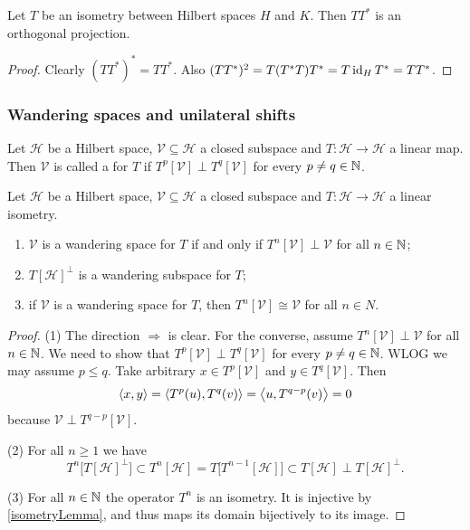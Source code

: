 \begin{lemma} \label{isometryRangeProjection}
Let $T$ be an isometry between Hilbert spaces $H$ and $K$. Then $TT^*$ is an orthogonal projection.
\end{lemma}
\begin{proof}
Clearly $(TT^*)^* = TT^*$. Also $(TT^*)^2 = T(T^*T)T^* = T\operatorname{id}_HT^* = TT^*$.
\end{proof}


\subsubsection{Wandering spaces and unilateral shifts}
\begin{definition}
Let $\mathcal{H}$ be a Hilbert space, $\mathcal{V}\subseteq \mathcal{H}$ a closed subspace and $T:\mathcal{H}\to \mathcal{H}$ a linear map. Then $\mathcal{V}$ is called a  for $T$ if $T^p[\mathcal{V}]\perp T^q[\mathcal{V}]$ for every $p\neq q\in\mathbb{N}$.
\end{definition}

\begin{lemma} \label{WoldLemma1}
Let $\mathcal{H}$ be a Hilbert space, $\mathcal{V}\subseteq \mathcal{H}$ a closed subspace and $T:\mathcal{H}\to \mathcal{H}$ a linear isometry.
\begin{enumerate}
\item $\mathcal{V}$ is a wandering space for $T$ \textup{if and only if} $T^n[\mathcal{V}]\perp \mathcal{V}$ for all $n\in\mathbb{N}$;
\item $T[\mathcal{H}]^\perp$ is a wandering subspace for $T$;
\item if $\mathcal{V}$ is a wandering space for $T$, then $T^n[\mathcal{V}] \cong \mathcal{V}$ for all $n\in N$.
\end{enumerate}
\end{lemma}
\begin{proof}
(1) The direction $\Rightarrow$ is clear. For the converse, assume $T^n[\mathcal{V}]\perp \mathcal{V}$ for all $n\in\mathbb{N}$. We need to show that $T^p[\mathcal{V}]\perp T^q[\mathcal{V}]$ for every $p\neq q\in\mathbb{N}$. WLOG we may assume $p\leq q$. Take arbitrary $x\in T^p[\mathcal{V}]$ and $y\in T^q[\mathcal{V}]$. Then
\[ \inner{x,y} = \inner{T^p(u), T^q(v)} = \inner{u, T^{q-p}(v)} = 0 \]
because $\mathcal{V} \perp T^{q-p}[\mathcal{V}]$.

(2) For all $n\geq 1$ we have
\[ T^{n}\big[T[\mathcal{H}]^\perp\big] \subset T^{n}[\mathcal{H}] = T\big[T^{n-1}[\mathcal{H}]\big] \subset T[\mathcal{H}] \perp T[\mathcal{H}]^\perp. \]

(3) For all $n\in \mathbb{N}$ the operator $T^n$ is an isometry. It is injective by \ref{isometryLemma}, and thus maps its domain bijectively to its image.
\end{proof}

